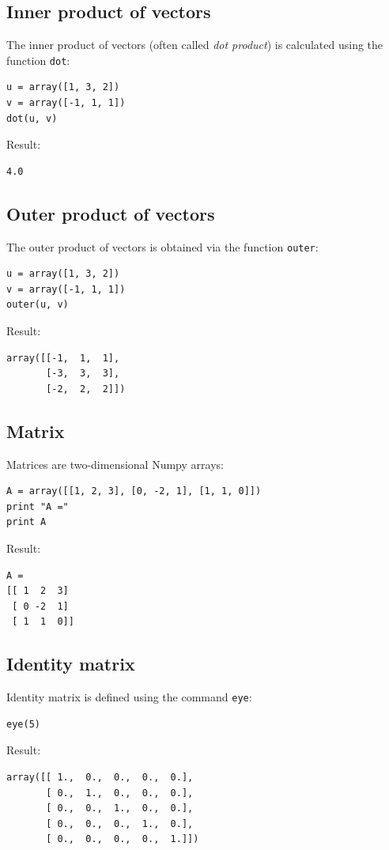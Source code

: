 \documentclass[article,A4,12pt]{llncs}
\begin{document}
\subsection{Inner product of vectors}

The inner product of vectors (often called {\em dot product}) is calculated
using the function {\tt dot}:

\begin{verbatim}
u = array([1, 3, 2])
v = array([-1, 1, 1])
dot(u, v)
\end{verbatim}
Result:
\begin{verbatim}
4.0
\end{verbatim}

\subsection{Outer product of vectors}

The outer product of vectors is obtained via the function {\tt outer}:
\begin{verbatim}
u = array([1, 3, 2])
v = array([-1, 1, 1])
outer(u, v)
\end{verbatim}
Result:
\begin{verbatim}
array([[-1,  1,  1],
       [-3,  3,  3],
       [-2,  2,  2]])
\end{verbatim}

\subsection{Matrix}

Matrices are two-dimensional Numpy arrays:
\begin{verbatim}
A = array([[1, 2, 3], [0, -2, 1], [1, 1, 0]])
print "A ="
print A
\end{verbatim}
Result:
\begin{verbatim}
A =
[[ 1  2  3]
 [ 0 -2  1]
 [ 1  1  0]]
\end{verbatim}


\subsection{Identity matrix}

Identity matrix is defined using the command {\tt eye}:
\begin{verbatim}
eye(5)
\end{verbatim}
Result:
\begin{verbatim}
array([[ 1.,  0.,  0.,  0.,  0.],
       [ 0.,  1.,  0.,  0.,  0.],
       [ 0.,  0.,  1.,  0.,  0.],
       [ 0.,  0.,  0.,  1.,  0.],
       [ 0.,  0.,  0.,  0.,  1.]])
\end{verbatim}
\end{document}
